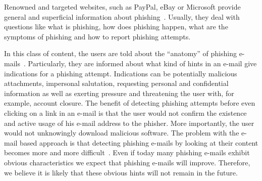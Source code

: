 \begin{description}[leftmargin=0cm]
	\item[General Knowledge Transfer:] Renowned and targeted websites, such as PayPal, eBay or Microsoft provide general and superficial information about phishing~\cite{generalknowledgemicrosoft, generalknowledgepaypal, generalknowledgeebay}.
	Usually, they deal with questions like what is phishing, how does phishing happen, what are the symptoms of phishing and how to report phishing attempts.
	\item[E-Mail Based Knowledge:] In this class of content, the users are told about the ``anatomy'' of phishing e-mails~\cite{antiphishingphyllis, sonicwall}. Particularly, they are informed about what kind of hints in an e-mail give indications for a phishing attempt.
 Indications can be potentially malicious attachments, impersonal salutation, requesting personal and confidential information as well as exerting pressure and threatening the user with, for example, account closure.
 The benefit of detecting phishing attempts before even clicking on a link in an e-mail is that the user would not confirm the existence and active usage of his e-mail address to the phisher.
 More importantly, the user would not unknowingly download malicious software.
 The problem with the e-mail based approach is that detecting phishing e-mails by looking at their content becomes more and more difficult~\cite{microsoftphishing,spamfighter}. Even if today  many phishing e-mails exhibit obvious characteristics we expect that phishing e-mails will improve. Therefore, we believe it is likely that these obvious hints will not remain in the future. 


\end{description}
